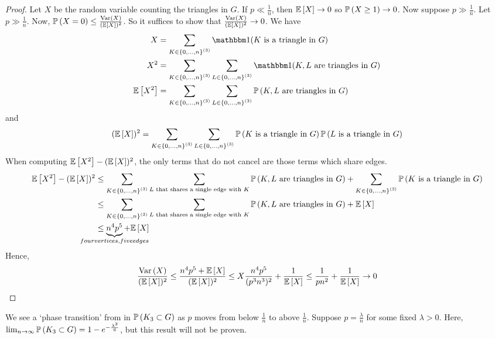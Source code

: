\begin{proof}
	Let \( X \) be the random variable counting the triangles in \( G \).
	If \( p \ll \frac{1}{n} \), then \( \mathbb{E}\left[{X}\right] \to 0 \) so \( \mathbb{P}\left({X \geq 1}\right) \to 0 \).
	Now suppose \( p \gg \frac{1}{n} \).
	Let \( p \gg \frac{1}{n} \).
	Now, \( \mathbb{P}\left({X = 0}\right) \leq \frac{\operatorname{Var}\left({X}\right)}{(\mathbb{E}\left[{X}\right])^2} \).
	So it suffices to show that \( \frac{\operatorname{Var}\left({X}\right)}{(\mathbb{E}\left[{X}\right])^2} \to 0 \).
	We have
	\begin{align*}
		X &= \sum_{K \in \qty{0, \dots, n}^{(3)}} \mathbbm 1(K \text{ is a triangle in } G) \\
		X^2 &= \sum_{K \in \qty{0, \dots, n}^{(3)}} \sum_{L \in \qty{0, \dots, n}^{(3)}} \mathbbm 1(K, L \text{ are triangles in } G) \\
		\expect{X^2} &= \sum_{K \in \qty{0, \dots, n}^{(3)}} \sum_{L \in \qty{0, \dots, n}^{(3)}} \prob{K, L \text{ are triangles in } G}
	\end{align*}
	and
	\[ (\mathbb{E}\left[{X}\right])^2 = \sum_{K \in \qty{0, \dots, n}^{(3)}} \sum_{L \in \qty{0, \dots, n}^{(3)}} \mathbb{P}\left({K \text{ is a triangle in } G}\right) \mathbb{P}\left({L \text{ is a triangle in } G}\right) \]
	When computing \( \mathbb{E}\left[{X^2}\right] - (\mathbb{E}\left[{X}\right])^2 \), the only terms that do not cancel are those terms which share edges.
	\begin{align*}
		\expect{X^2} - (\expect{X})^2 &\leq \sum_{K \in \qty{0, \dots, n}^{(3)}} \sum_{L \text{ that shares a single edge with } K} \prob{K, L \text{ are triangles in } G} + \sum_{K \in \qty{0, \dots, n}^{(3)}} \prob{K \text{ is a triangle in } G} \\
		&\leq \sum_{K \in \qty{0, \dots, n}^{(3)}} \sum_{L \text{ that shares a single edge with } K} \prob{K, L \text{ are triangles in } G} + \expect{X} \\
		&\leq \underbrace{n^4 p^5}_{\mathclap{four vertices, five edges}} + \expect{X}
	\end{align*}
	Hence,
	\[ \frac{\operatorname{Var}\left({X}\right)}{(\mathbb{E}\left[{X}\right])^2} \leq \frac{n^4 p^5 + \mathbb{E}\left[{X}\right]}{(\mathbb{E}\left[{X}\right])^2} \leq X \frac{n^4 p^5}{(p^3 n^3)^2} + \frac{1}{\mathbb{E}\left[{X}\right]} \leq \frac{1}{pn^2} + \frac{1}{\mathbb{E}\left[{X}\right]} \to 0 \]
\end{proof}
\begin{remark}
	We see a `phase transition' from in \( \mathbb{P}\left({K_3 \subset G}\right) \) as \( p \) moves from below \( \frac{1}{n} \) to above \( \frac{1}{n} \).
	Suppose \( p = \frac{\lambda}{n} \) for some fixed \( \lambda > 0 \).
	Here, \( \lim_{n \to \infty} \mathbb{P}\left({K_3 \subset G}\right) = 1 - e^{-\frac{\lambda^3}{6}} \), but this result will not be proven.
\end{remark}
